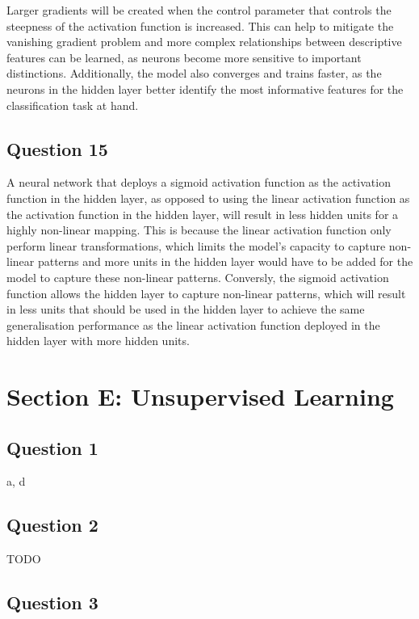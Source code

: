 \documentclass[10pt]{article}
\begin{document}
Larger gradients will be created when the control parameter that controls the steepness of the activation function is increased.
This can help to mitigate the vanishing gradient problem and more complex relationships between descriptive features can be learned,
as neurons become more sensitive to important distinctions.
Additionally, the model also converges and trains faster, as the neurons in the hidden layer better identify the most informative features
for the classification task at hand.

\subsection*{Question 15}

A neural network that deploys a sigmoid activation function as the activation function in the hidden layer, as
opposed to using the linear activation function as the activation function in the hidden layer, will
result in less hidden units for a highly non-linear mapping. This is because the linear activation
function only perform linear transformations, which limits the model's capacity to capture non-linear
patterns and more units in the hidden layer would have to be added for the model to capture these non-linear patterns.
Conversly, the sigmoid activation function allows the hidden layer to capture non-linear patterns, which
will result in less units that should be used in the hidden layer to achieve the same generalisation
performance as the linear activation function deployed in the hidden layer with more hidden units.  

\section*{Section E: Unsupervised Learning}

\subsection*{Question 1}

a, d

\subsection*{Question 2}

TODO

\subsection*{Question 3}
\end{document}
